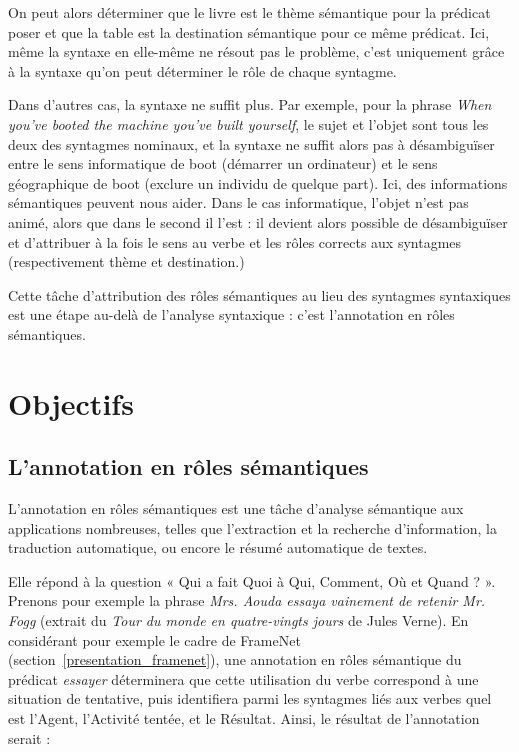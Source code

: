 On peut alors déterminer que le livre est le thème sémantique pour la prédicat
poser et que la table est la destination sémantique pour ce même prédicat. Ici,
même la syntaxe en elle-même ne résout pas le problème, c'est uniquement grâce
à la syntaxe qu'on peut déterminer le rôle de chaque syntagme.

Dans d'autres cas, la syntaxe ne suffit plus. Par exemple, pour la phrase
\emph{When you've booted the machine you've built yourself}, le sujet et
l'objet sont tous les deux des syntagmes nominaux, et la syntaxe ne suffit
alors pas à désambiguïser entre le sens informatique de boot (démarrer un
ordinateur) et le sens géographique de boot (exclure un individu de quelque
part). Ici, des informations sémantiques peuvent nous aider. Dans le cas
informatique, l'objet n'est pas animé, alors que dans le second il l'est : il
devient alors possible de désambiguïser et d'attribuer à la fois le sens au
verbe et les rôles corrects aux syntagmes (respectivement thème et
destination.)

Cette tâche d'attribution des rôles sémantiques au lieu des syntagmes
syntaxiques est une étape au-delà de l'analyse syntaxique : c'est l'annotation
en rôles sémantiques.

\section{Objectifs}

\subsection{L'annotation en rôles sémantiques}

L'annotation en rôles sémantiques est une tâche d'analyse sémantique aux
applications nombreuses, telles que l'extraction et la recherche d'information,
la traduction automatique, ou encore le résumé automatique de textes.

Elle répond à la question « Qui a fait Quoi à Qui, Comment, Où et Quand ? ».
Prenons pour exemple la phrase \emph{Mrs. Aouda essaya vainement de retenir Mr.
Fogg} (extrait du \emph{Tour du monde en quatre-vingts jours} de Jules Verne).
En considérant pour exemple le cadre de FrameNet
(section~\ref{presentation_framenet}), une annotation en rôles sémantique du
prédicat \emph{essayer} déterminera que cette utilisation du verbe correspond à
une situation de tentative, puis identifiera parmi les syntagmes liés aux
verbes quel est l'Agent, l'Activité tentée, et le Résultat.  Ainsi, le résultat
de l'annotation serait :

